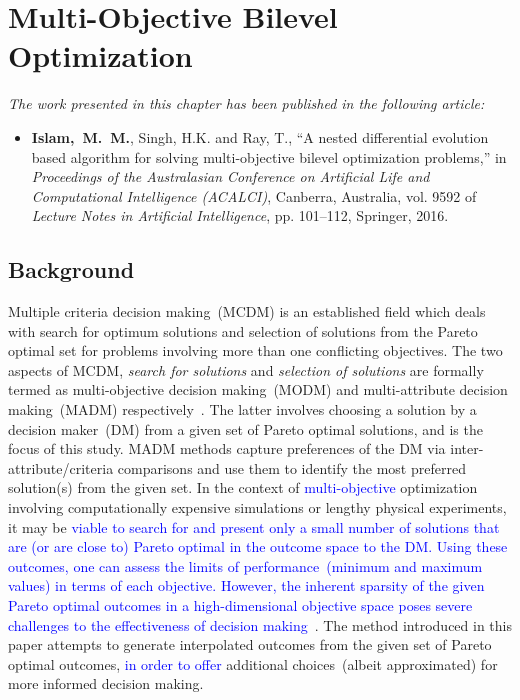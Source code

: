 \chapter{Multi-Objective Bilevel Optimization}


\begin{tcolorbox}
\textit{The work presented in this chapter has been published in the following article:}
\small
\begin{itemize}
\item \textbf{{Islam,~M.~M.}}, {Singh, H.K.} and {Ray, T.}, ``A nested differential evolution based algorithm for solving multi-objective bilevel optimization problems,'' in {\em Proceedings of the Australasian Conference on Artificial Life and Computational Intelligence (ACALCI)}, Canberra, Australia, vol. 9592 of {\em Lecture Notes in Artificial Intelligence}, pp. 101--112, Springer, 2016.
\end{itemize}
\end{tcolorbox}

\section{Background}
\label{sec:intro}

Multiple criteria decision making~(MCDM) is an established field which deals with search for optimum solutions and selection of solutions from the Pareto optimal set for problems involving more than one conflicting {\color{blue}objectives}. The two aspects of MCDM, \emph{search for solutions} and \emph{selection of solutions} are formally termed as multi-objective decision making~(MODM) and multi-attribute decision making~(MADM) respectively~\cite{yang1994evidential}. The latter involves choosing a solution by a decision maker~(DM) from a given set of Pareto optimal solutions, and is the focus of this study. MADM methods capture preferences of the DM via inter-attribute/criteria comparisons and use them to identify the most preferred solution(s) from the given set. In the context of \textcolor{blue}{multi-objective} optimization involving computationally expensive simulations or lengthy physical experiments, it may be \textcolor{blue}{viable to search for and present only a small number of solutions that are (or are close to) Pareto optimal in the outcome space to the DM. Using these outcomes, one can assess the limits of performance~(minimum and maximum values) in terms of each objective. However, the inherent sparsity of the given Pareto optimal outcomes in a high-dimensional objective space poses severe challenges to the effectiveness of decision making}~\cite{ruzika2005approximation}. The method introduced in this paper attempts to generate interpolated outcomes from the given set of Pareto optimal outcomes, \textcolor{blue}{in order to offer} additional choices~({\color{blue}albeit approximated}) for more informed decision making.

